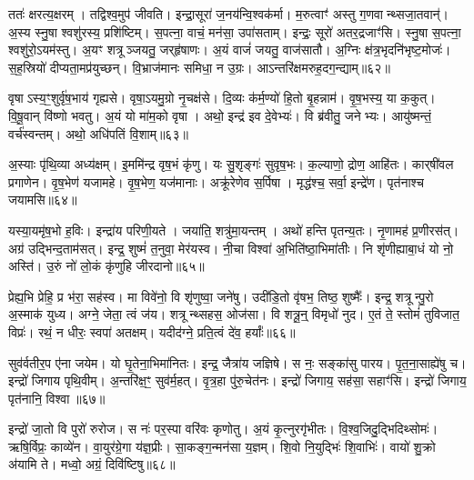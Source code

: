 ततः॑ क्षरत्य॒क्षरम्।
तद्विश्व॒मुप॑ जीवति।
इन्द्रा॒सूरा॑ ज॒नय॑न्वि॒श्वक॑र्मा।
म॒रुत्वाꣳ॑ अस्तु ग॒णवान्थ्सजा॒तवान्॑।
अ॒स्य स्नु॒षा श्वशु॑रस्य॒ प्रशि॑ष्टिम्।
स॒पत्ना॒ वाचं॒ मन॑सा॒ उपा॑सताम्।
इन्द्रः॒ सूरो॑ अतर॒द्रजाꣳ॑सि।
स्नु॒षा स॒पत्ना॒ श्वशु॑रो॒\-ऽयम॑स्तु।
अ॒यꣳ शत्रूञ्जयतु॒ जर्‌\mbox{}हृ॑षाणः।
अ॒यं वाजं॑ जयतु॒ वाज॑सातौ।
अ॒ग्निः क्ष॑त्र॒भृदनि॑भृष्ट॒मोजः॑।
स॒ह॒स्रियो॑ दीप्यता॒मप्र॑युच्छन्।
वि॒भ्राज॑मानः समिधा॒ न उ॒ग्रः।
आऽन्तरि॑क्षमरुह॒दग॒न्द्याम्॥६२॥\anuvakamend[धा॒रय॑न्पुरो॒डाशं॒ बृह॒स्पतिं॑ ज॒घन॑च्युतिमान॒न्दो भग॑स्य तृप्याण्य॒ग्नेः पृ॑थि॒वी यज्व॑न एतु प्र॒दिश॒श्चत॑स्रो॒ वाज॑सातौ च॒त्वारि॑ च]

वृषा\-ऽस्य॒ꣳ॒शुर्वृ॑ष॒भाय॑ गृह्यसे।
वृषा॒\-ऽयमु॒ग्रो नृ॒चक्ष॑से।
दि॒व्यः क॑र्म॒ण्यो॑ हि॒तो बृ॒हन्नाम॑।
वृ॒ष॒भस्य॒ या क॒कुत्।
वि॒षू॒वान् वि॑ष्णो भवतु।
अ॒यं यो मा॑म॒को वृषा।
अथो॒ इन्द्र॑ इव दे॒वेभ्यः॑।
वि ब्र॑वीतु॒ जनेभ्यः।
आयु॑ष्मन्तं॒ वर्च॑स्वन्तम्।
अथो॒ अधि॑पतिं वि॒शाम्॥६३॥

अ॒स्याः पृ॑थि॒व्या अध्य॑क्षम्।
इ॒ममि॑न्द्र वृष॒भं कृ॑णु।
यः सु॒शृङ्गः॑ सुवृष॒भः।
क॒ल्याणो॒ द्रोण॒ आहि॑तः।
कार्‌\mbox{}षी॑वल प्रगाणेन।
वृ॒ष॒भेण॑ यजामहे।
वृ॒ष॒भेण॒ यज॑मानाः।
अक्रू॑रेणेव स॒र्पिषा।
मृद्ध॑श्च॒ सर्वा॒ इन्द्रे॑ण।
पृत॑नाश्च जयामसि॥६४॥

यस्या॒यमृ॑ष॒भो ह॒विः।
इन्द्रा॑य परिणी॒यते।
जया॑ति॒ शत्रु॑मा॒यन्तम्।
अथो॑ हन्ति पृतन्य॒तः।
नृ॒णामह॑ प्र॒णीरस॑त्।
अग्र॑ उद्भिन्द॒ताम॑सत्।
इन्द्र॒ शुष्मं॑ त॒नुवा॒ मेर॑यस्व।
नी॒चा विश्वा॑ अ॒भिति॑ष्ठा॒भिमा॑तीः।
नि शृ॑णीह्याबा॒धं यो नो॒ अस्ति॑।
उ॒रुं नो॑ लो॒कं कृ॑णुहि जीरदानो॥६५॥

प्रेह्य॒भि प्रेहि॒ प्र भ॑रा॒ सह॑स्व।
मा विवे॑नो॒ वि शृ॑णुष्वा॒ जने॑षु।
उदी॑डि॒तो वृ॑षभ॒ तिष्ठ॒ शुष्मैः᳚।
इन्द्र॒ शत्रून्पु॒रो अ॒स्माक॑ युध्य।
अग्ने॒ जेता॒ त्वं ज॑य।
शत्रून्थ्सहस॒ ओज॑सा।
वि शत्रू॒न्॒ विमृधो॑ नुद।
ए॒तं ते॒ स्तोमं॑ तुविजात॒ विप्रः॑।
रथं॒ न धीरः॒ स्वपा॑ अतक्षम्।
यदीद॑ग्ने॒ प्रति॒त्वं दे॑व॒ हर्याः᳚॥६६॥

सुव॑र्वतीर॒प ए॑ना जयेम।
यो घृ॒तेना॒भिमा॑नितः।
इन्द्र॒ जैत्रा॑य जज्ञिषे।
स नः॒ सङ्का॑सु पारय।
पृ॒त॒ना॒साह्ये॑षु च।
इन्द्रो॑ जिगाय पृथि॒वीम्।
अ॒न्तरि॑क्ष॒ꣳ॒ सुव॑र्म॒हत्।
वृ॒त्र॒हा पु॑रु॒चेत॑नः।
इन्द्रो॑ जिगाय॒ सह॑सा॒ सहाꣳ॑सि।
इन्द्रो॑ जिगाय॒ पृत॑नानि॒ विश्वा॥६७॥

इन्द्रो॑ जा॒तो वि पुरो॑ रुरोज।
स नः॑ पर॒स्पा वरि॑वः कृणोतु।
अ॒यं कृ॒त्नुरगृ॑भीतः।
वि॒श्व॒जिदु॒द्भिदिथ्सोमः॑।
ऋषि॒र्विप्रः॒ काव्ये॑न।
वा॒युर॑ग्रे॒गा य॑ज्ञ॒प्रीः।
सा॒कङ्ग॒न्मन॑सा य॒ज्ञम्।
शि॒वो नि॒युद्भिः॑ शि॒वाभिः॑।
वायो॑ शु॒क्रो अ॑यामि ते।
मध्वो॒ अग्रं॒ दिवि॑ष्टिषु॥६८॥

